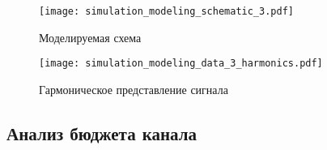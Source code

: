 \begin{figure}[!ht]
    \centering
    \texttt{[image: simulation\_modeling\_schematic\_3.pdf]}
    \caption{Моделируемая схема}%
    \label{fig:simulation_modeling_schematic_3}
\end{figure}

\begin{figure}[!ht]
    \centering
    \texttt{[image: simulation\_modeling\_data\_3\_harmonics.pdf]}
    \caption{Гармоническое представление сигнала}%
    \label{fig:simulation_modeling_data_3_harmonics}
\end{figure}

\subsection{Анализ бюджета канала}

